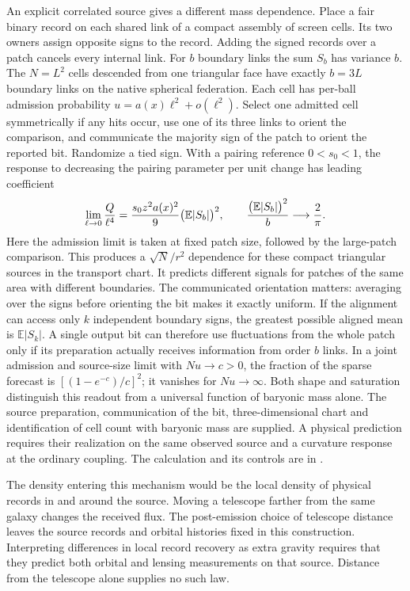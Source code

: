 \documentclass[11pt]{article}
\begin{document}
An explicit correlated source gives a different mass dependence.
Place a fair binary record on each shared link of a compact assembly
of screen cells. Its two owners assign opposite signs to the record.
Adding the signed records over a patch cancels every internal link.
For $b$ boundary links the sum $S_b$ has variance $b$. The
$N=L^2$ cells descended from one triangular face have exactly
$b=3L$ boundary links on the native spherical federation. Each
cell has per-ball admission probability $u=a(x)\ell^2+o(\ell^2)$.
Select one admitted cell symmetrically if any hits occur, use one of
its three links to orient the comparison, and communicate the majority
sign of the patch to orient the reported bit. Randomize a tied sign.
With a pairing reference $0<s_0<1$, the response to decreasing the
pairing parameter per unit change has leading coefficient
\[
 \lim_{\ell\to0}{Q\over\ell^4}
   ={s_0 z^2 a(x)^2\over9}\bigl(\mathbb E|S_b|\bigr)^2,
 \qquad
 {\bigl(\mathbb E|S_b|\bigr)^2\over b}\longrightarrow {2\over\pi}.
\]
Here the admission limit is taken at fixed patch size, followed by the
large-patch comparison. This produces a $\sqrt N/r^2$ dependence for
these compact triangular sources in the transport chart. It predicts
different signals for patches of the same area with different boundaries.
The communicated orientation matters: averaging over the signs before
orienting the bit makes it exactly uniform. If the alignment can access only $k$ independent boundary signs, the
greatest possible aligned mean is $\mathbb E|S_k|$. A single output
bit can therefore use fluctuations from the whole patch only if its
preparation actually receives information from order $b$ links. In a
joint admission and source-size limit with $Nu\to c>0$, the fraction
of the sparse forecast is $[(1-e^{-c})/c]^2$; it vanishes for
$Nu\to\infty$. Both shape and saturation distinguish this readout from
a universal function of baryonic mass alone. The source preparation,
communication of the bit, three-dimensional chart and identification
of cell count with baryonic mass are supplied. A physical prediction
requires their realization on the same observed source and a curvature
response at the ordinary coupling.
The calculation and its controls are in
.

The density entering this mechanism would be the local density of
physical records in and around the source. Moving a telescope farther from the same galaxy changes the received
flux. The post-emission choice of telescope distance leaves the source
records and orbital histories fixed in this construction.
Interpreting differences in local record recovery as extra gravity
requires that they predict both orbital and lensing measurements on
that source. Distance from the telescope alone supplies no such law.
\end{document}
